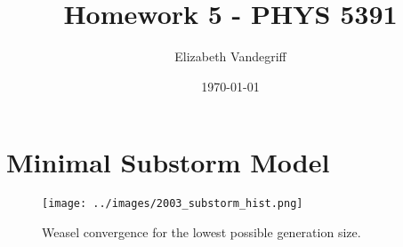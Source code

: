 \documentclass[12pt, letterpaper]{article}
\begin{document}
\title{Homework 5 - PHYS 5391}
\author{Elizabeth Vandegriff}
\date{\today}

\maketitle
\newpage
\tableofcontents
\newpage

\section{Minimal Substorm Model}

\begin{figure}[!ht]
  \centering
  \texttt{[image: ../images/2003\_substorm\_hist.png]}
  \caption{Weasel convergence for the lowest possible generation size.}
  \label{fig:lowlim}
\end{figure}
\end{document}
